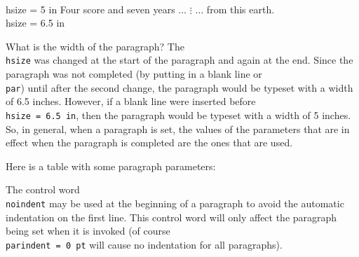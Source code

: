 \beginuser 
\\hsize = 5 in 
Four score and seven years $\ldots$ 
$\vdots$ 
$\ldots$ from this earth. 
\\hsize = 6.5 in 
 
\enduser 
 
What is the width of the paragraph?  The {\tt \\hsize} was 
changed at the start of the paragraph and again at the end. 
Since the paragraph was not completed (by putting in a blank line 
or {\tt \\par}) until after the second change, the paragraph 
would be typeset with a width of 6.5 inches. However, if a blank 
line were inserted before {\tt \\hsize = 6.5 in}, then the 
paragraph would be typeset with a width of 5 inches.  So, in 
general, when a paragraph is set, the values of the parameters 
that are in effect when the paragraph is completed are the ones 
that are used. 
 
Here is a table with some paragraph parameters: 
 
 
 
The control word {\tt \\noindent} may be used at the beginning of 
a paragraph to avoid the automatic indentation on the first line. 
This control word will only affect the paragraph being set when 
it is invoked (of course {\tt \\parindent = 0 pt} will cause no 
indentation for all paragraphs). 
 
